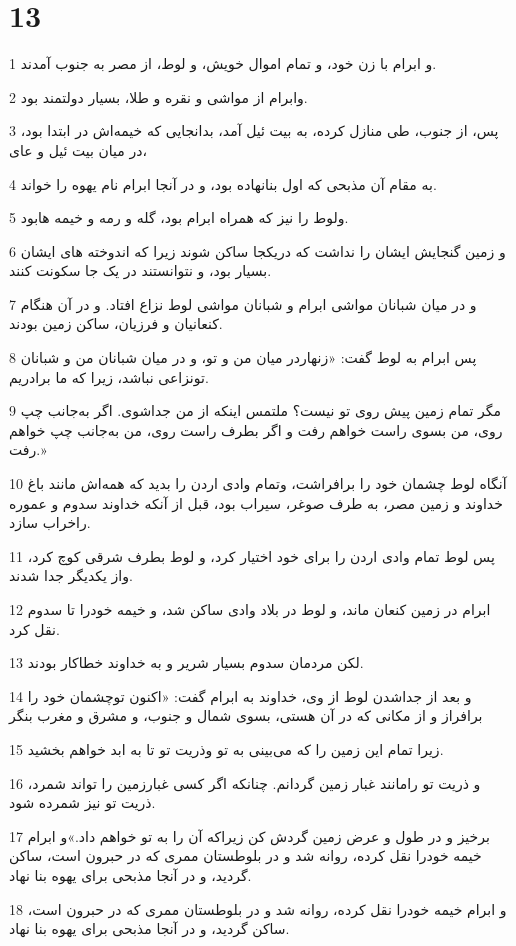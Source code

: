 \chapter{13}

\par 1 و ابرام با زن خود، و تمام اموال خویش، و لوط، از مصر به جنوب آمدند.
\par 2 وابرام از مواشی و نقره و طلا، بسیار دولتمند بود.
\par 3 پس، از جنوب، طی منازل کرده، به بیت ئیل آمد، بدانجایی که خیمه‌اش در ابتدا بود، در میان بیت ئیل و عای،
\par 4 به مقام آن مذبحی که اول بنانهاده بود، و در آنجا ابرام نام یهوه را خواند.
\par 5 ولوط را نیز که همراه ابرام بود، گله و رمه و خیمه هابود.
\par 6 و زمین گنجایش ایشان را نداشت که دریکجا ساکن شوند زیرا که اندوخته های ایشان بسیار بود، و نتوانستند در یک جا سکونت کنند.
\par 7 و در میان شبانان مواشی ابرام و شبانان مواشی لوط نزاع افتاد. و در آن هنگام کنعانیان و فرزیان، ساکن زمین بودند.
\par 8 پس ابرام به لوط گفت: «زنهاردر میان من و تو، و در میان شبانان من و شبانان تونزاعی نباشد، زیرا که ما برادریم.
\par 9 مگر تمام زمین پیش روی تو نیست؟ ملتمس اینکه از من جداشوی. اگر به‌جانب چپ روی، من بسوی راست خواهم رفت و اگر بطرف راست روی، من به‌جانب چپ خواهم رفت.»
\par 10 آنگاه لوط چشمان خود را برافراشت، وتمام وادی اردن را بدید که همه‌اش مانند باغ خداوند و زمین مصر، به طرف صوغر، سیراب بود، قبل از آنکه خداوند سدوم و عموره راخراب سازد.
\par 11 پس لوط تمام وادی اردن را برای خود اختیار کرد، و لوط بطرف شرقی کوچ کرد، واز یکدیگر جدا شدند.
\par 12 ابرام در زمین کنعان ماند، و لوط در بلاد وادی ساکن شد، و خیمه خودرا تا سدوم نقل کرد.
\par 13 لکن مردمان سدوم بسیار شریر و به خداوند خطاکار بودند.
\par 14 و بعد از جداشدن لوط از وی، خداوند به ابرام گفت: «اکنون توچشمان خود را برافراز و از مکانی که در آن هستی، بسوی شمال و جنوب، و مشرق و مغرب بنگر
\par 15 زیرا تمام این زمین را که می‌بینی به تو وذریت تو تا به ابد خواهم بخشید.
\par 16 و ذریت تو رامانند غبار زمین گردانم. چنانکه اگر کسی غبارزمین را تواند شمرد، ذریت تو نیز شمرده شود.
\par 17 برخیز و در طول و عرض زمین گردش کن زیراکه آن را به تو خواهم داد.»و ابرام خیمه خودرا نقل کرده، روانه شد و در بلوطستان ممری که در حبرون است، ساکن گردید، و در آنجا مذبحی برای یهوه بنا نهاد.
\par 18 و ابرام خیمه خودرا نقل کرده، روانه شد و در بلوطستان ممری که در حبرون است، ساکن گردید، و در آنجا مذبحی برای یهوه بنا نهاد.
 
